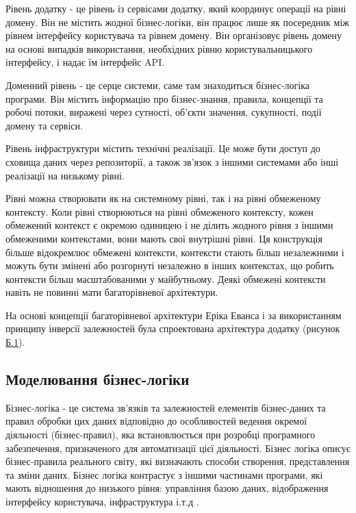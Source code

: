 Рівень додатку - це рівень із сервісами додатку,
який координує операції на рівні домену. Він не містить жодної бізнес-логіки,
він працює лише як посередник між рівнем інтерфейсу користувача та рівнем домену.
Він організовує рівень домену на основі випадків використання,
необхідних рівню користувальницького інтерфейсу,
і надає їм інтерфейс API.

Доменний рівень - це серце системи, саме там знаходиться бізнес-логіка програми.
Він містить інформацію про бізнес-знання, правила, концепції та робочі потоки,
виражені через сутності, об’єкти значення, сукупності, події домену та сервіси.

Рівень інфраструктури містить технічні реалізації.
Це може бути доступ до сховища даних через репозиторії,
а також зв'язок з іншими системами або інші реалізації на низькому рівні.

Рівні можна створювати як на системному рівні, так і
на рівні обмеженому контексту. Коли рівні створюються на рівні
обмеженого контексту, кожен обмежений контекст є окремою
одиницею і не ділить жодного рівня з іншими обмеженими контекстами,
вони мають свої внутрішні рівні. Ця конструкція більше
відокремлює обмежені контексти, контексти стають більш незалежними
і можуть бути змінені або розгорнуті незалежно в
інших контекстах, що робить контексти більш масштабованими
у майбутньому. Деякі обмежені контексти навіть не повинні
мати багаторівневої архітектури.


На основі концепції багаторівневої архітектури Еріка Еванса і за
використанням принципу інверсії залежностей була 
спроектована архітектура додатку (рисунок \hyperref[b1]{Б.1}).

\subsection{Моделювання бізнес-логіки}

Бізнес-логіка - це система зв'язків та залежностей елементів бізнес-даних
та правил обробки цих даних відповідно до особливостей ведення окремої діяльності (бізнес-правил),
яка встановлюється при розробці програмного забезпечення,
призначеного для автоматизації цієї діяльності. Бізнес логіка описує бізнес-правила реального світу,
які визначають способи створення, представлення та зміни даних.
Бізнес логіка контрастує з іншими частинами програми,
які мають відношення до низького рівня: управління базою даних,
відображення інтерфейсу користувача, інфраструктура і.т.д \cite{business-def}.

